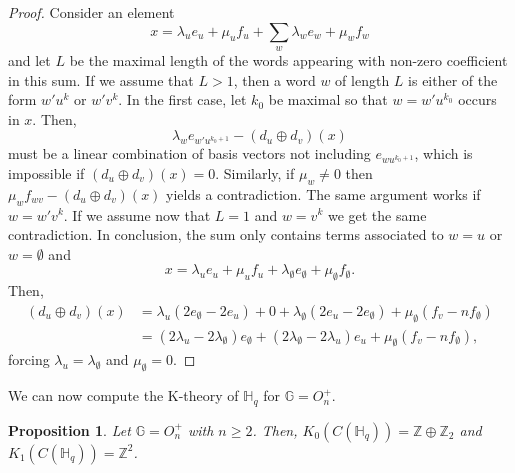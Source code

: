 \documentclass[a4paper, 11pt]{amsart}
\theoremstyle{plain}
\newtheorem{prop}[thm]{Proposition}
\theoremstyle{definition}
\theoremstyle{remark}
\newcommand{\G}{\mathbb{G}}
\newcommand{\HH}{\mathbb{H}}
\newcommand{\Z}{\mathbb{Z}}
\begin{document}
\begin{proof}
Consider an element
\begin{equation*}
x = \lambda_{u}e_{u} + \mu_{u}f_{u} + \sum_{w}\lambda_{w}e_{w} + \mu_{w}f_{w}
\end{equation*}
and let $L$ be the maximal length of the words appearing with non-zero coefficient in this sum. If we assume that $L > 1$, then a word $w$ of length $L$ is either of the form $w'u^{k}$ or $w'v^{k}$. In the first case, let $k_{0}$ be maximal so that $w = w'u^{k_{0}}$ occurs in $x$. Then,
\begin{equation*}
\lambda_{w}e_{w'u^{k_{0}+1}} - (d_{u}\oplus d_{v})(x)
\end{equation*}
must be a linear combination of basis vectors not including $e_{wu^{k_{0}+1}}$, which is impossible if $(d_{u}\oplus d_{v})(x) = 0$. Similarly, if $\mu_{w}\neq 0$ then $\mu_{w}f_{wv} - (d_{u}\oplus d_{v})(x)$ yields a contradiction. The same argument works if $w = w'v^{k}$. If we assume now that $L = 1$ and $w = v^{k}$ we get the same contradiction. In conclusion, the sum only contains terms associated to $w = u$ or $w = \emptyset$ and
\begin{equation*}
x = \lambda_{u} e_{u} + \mu_{u}f_{u} + \lambda_{\emptyset}e_{\emptyset} + \mu_{\emptyset}f_{\emptyset}.
\end{equation*}
Then,
\begin{align*}
(d_{u}\oplus d_{v})(x) & = \lambda_{u}(2e_{\emptyset} - 2e_{u}) + 0 + \lambda_{\emptyset}(2e_{u} - 2e_{\emptyset}) + \mu_{\emptyset}(f_{v} - nf_{\emptyset}) \\
& = (2\lambda_{u} - 2\lambda_{\emptyset})e_{\emptyset} + (2\lambda_{\emptyset} - 2\lambda_{u})e_{u} + \mu_{\emptyset}(f_{v} - nf_{\emptyset}),
\end{align*}
forcing $\lambda_{u} = \lambda_{\emptyset}$ and $\mu_{\emptyset} = 0$.
\end{proof}

We can now compute the K-theory of $\HH_{q}$ for $\G = O_{n}^{+}$.

\begin{prop}
Let $\G = O_{n}^{+}$ with $n\geqslant 2$. Then, $K_{0}(C(\HH_{q})) = \Z\oplus\Z_{2}$ and $K_{1}(C(\HH_{q})) = \Z^{2}$.
\end{prop}
\end{document}
